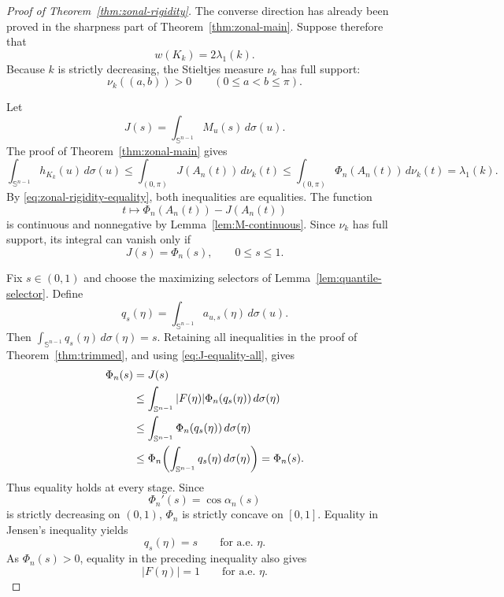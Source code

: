 \documentclass[11pt,reqno]{amsart}
\theoremstyle{remark}
\begin{document}
\begin{proof}[Proof of Theorem~\ref{thm:zonal-rigidity}]
The converse direction has already been proved in the sharpness part of
Theorem~\ref{thm:zonal-main}.  Suppose therefore that
\begin{equation}\label{eq:zonal-rigidity-equality}
 w(K_k)=2\lambda_1(k).
\end{equation}
Because $k$ is strictly decreasing, the Stieltjes measure $\nu_k$ has full
support:
\[
 \nu_k((a,b))>0
 \qquad
 (0\le a<b\le\pi).
\]

Let
\[
 J(s)=\int_{\mathbb S^{n-1}} M_u(s)\,d\sigma(u).
\]
The proof of Theorem~\ref{thm:zonal-main} gives
\[
 \int_{\mathbb S^{n-1}} h_{K_k}(u)\,d\sigma(u)
 \le
 \int_{(0,\pi)}J(A_n(t))\,d\nu_k(t)
 \le
 \int_{(0,\pi)}\Phi_n(A_n(t))\,d\nu_k(t)
 =
 \lambda_1(k).
\]
By \eqref{eq:zonal-rigidity-equality}, both inequalities are equalities.
The function
\[
 t\longmapsto
 \Phi_n(A_n(t))-J(A_n(t))
\]
is continuous and nonnegative by Lemma~\ref{lem:M-continuous}.  Since
$\nu_k$ has full support, its integral can vanish only if
\begin{equation}\label{eq:J-equality-all}
 J(s)=\Phi_n(s),
 \qquad 0\le s\le1.
\end{equation}

Fix $s\in(0,1)$ and choose the maximizing selectors of
Lemma~\ref{lem:quantile-selector}.  Define
\[
 q_s(\eta)
 =
 \int_{\mathbb S^{n-1}}a_{u,s}(\eta)\,d\sigma(u).
\]
Then $\int_{\mathbb S^{n-1}} q_s(\eta)\,d\sigma(\eta)=s$.  Retaining all inequalities in the proof of
Theorem~\ref{thm:trimmed}, and using \eqref{eq:J-equality-all}, gives
\begin{align}
 \Phi_n(s)
 &=
 J(s)\notag\\
 &\le
 \int_{\mathbb S^{n-1}} |F(\eta)|\Phi_n(q_s(\eta))\,d\sigma(\eta)\notag\\
 &\le
 \int_{\mathbb S^{n-1}} \Phi_n(q_s(\eta))\,d\sigma(\eta)\notag\\
 &\le
 \Phi_n\!\left(\int_{\mathbb S^{n-1}} q_s(\eta)\,d\sigma(\eta)\right)
 =
 \Phi_n(s).
\label{eq:zonal-rigidity-chain}
\end{align}
Thus equality holds at every stage.  Since
\[
 \Phi_n'(s)=\cos\alpha_n(s)
\]
is strictly decreasing on $(0,1)$, $\Phi_n$ is strictly concave on $[0,1]$.
Equality in Jensen's inequality yields
\begin{equation}\label{eq:zonal-q}
 q_s(\eta)=s
 \qquad\text{for a.e. }\eta.
\end{equation}
As $\Phi_n(s)>0$, equality in the preceding inequality also gives
\begin{equation}\label{eq:zonal-F-sphere}
 |F(\eta)|=1
 \qquad\text{for a.e. }\eta.
\end{equation}


\end{proof}
\end{document}
